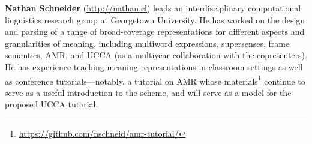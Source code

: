 \documentclass[11pt,table]{article}
\begin{document}
\textbf{Nathan Schneider} (\url{http://nathan.cl})
leads an interdisciplinary computational linguistics research group at Georgetown University. 
He has worked on the design and parsing of a range of broad-coverage representations for different aspects and granularities of meaning, including multiword expressions, supersenses, frame semantics, AMR, and UCCA (as a multiyear collaboration with the copresenters). 
He has experience teaching meaning representations in classroom settings as well as conference tutorials---notably, a tutorial on AMR \cite{amrtutorial} whose materials\footnote{\url{https://github.com/nschneid/amr-tutorial/}} continue to serve as a useful introduction to the scheme, 
and will serve as a model for the proposed UCCA tutorial.



\end{document}
